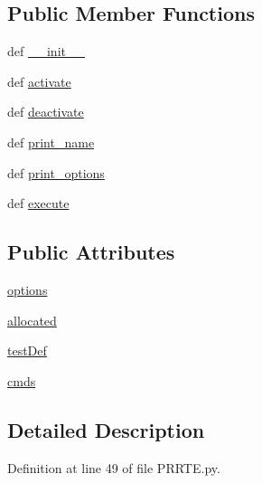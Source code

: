 \subsection*{Public Member Functions}
\begin{DoxyCompactItemize}
\item 
def \hyperlink{class_p_r_r_t_e_1_1_p_r_r_t_e_aab163ee5630ff741ddebce1f1a19dca6}{\-\_\-\-\_\-init\-\_\-\-\_\-}
\item 
def \hyperlink{class_p_r_r_t_e_1_1_p_r_r_t_e_aeb7fdaa1719c5203dc652ab0e09e208b}{activate}
\item 
def \hyperlink{class_p_r_r_t_e_1_1_p_r_r_t_e_a4ec48744745fb0829800dcfad01af45f}{deactivate}
\item 
def \hyperlink{class_p_r_r_t_e_1_1_p_r_r_t_e_a9531d7035e6acc2d9bcdd6e74e8d81f7}{print\-\_\-name}
\item 
def \hyperlink{class_p_r_r_t_e_1_1_p_r_r_t_e_aebd413e4294d6b247a3436557273f1c3}{print\-\_\-options}
\item 
def \hyperlink{class_p_r_r_t_e_1_1_p_r_r_t_e_aaf98bda8f91b9654255df6dd8ca90309}{execute}
\end{DoxyCompactItemize}
\subsection*{Public Attributes}
\begin{DoxyCompactItemize}
\item 
\hyperlink{class_p_r_r_t_e_1_1_p_r_r_t_e_a174321352f6234d4704b9a980574bdc7}{options}
\item 
\hyperlink{class_p_r_r_t_e_1_1_p_r_r_t_e_aa61e5452cb21084ebe29fddecf96b63e}{allocated}
\item 
\hyperlink{class_p_r_r_t_e_1_1_p_r_r_t_e_a797f27c656051565b7897358a7c28a40}{test\-Def}
\item 
\hyperlink{class_p_r_r_t_e_1_1_p_r_r_t_e_ac33721f4ed5d701613528962b88e16e3}{cmds}
\end{DoxyCompactItemize}


\subsection{Detailed Description}


Definition at line 49 of file P\-R\-R\-T\-E.\-py.



